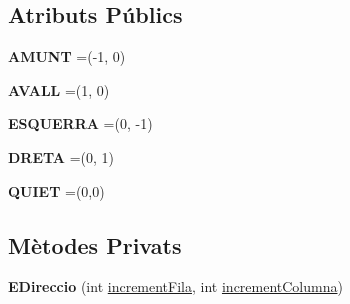 \subsection*{Atributs Públics}
\begin{DoxyCompactItemize}
\item 
\hypertarget{enumlogica_1_1enumeracions_1_1_e_direccio_a63eeb22e6f9d80a71a098b28e8852e1f}{{\bfseries A\+M\+U\+N\+T} =(-\/1, 0)}\label{enumlogica_1_1enumeracions_1_1_e_direccio_a63eeb22e6f9d80a71a098b28e8852e1f}

\item 
\hypertarget{enumlogica_1_1enumeracions_1_1_e_direccio_aa3a1d108fcda907ca1d07280769f1ec9}{{\bfseries A\+V\+A\+L\+L} =(1, 0)}\label{enumlogica_1_1enumeracions_1_1_e_direccio_aa3a1d108fcda907ca1d07280769f1ec9}

\item 
\hypertarget{enumlogica_1_1enumeracions_1_1_e_direccio_af02594ddfc4fb25ba88bd8b448701f30}{{\bfseries E\+S\+Q\+U\+E\+R\+R\+A} =(0, -\/1)}\label{enumlogica_1_1enumeracions_1_1_e_direccio_af02594ddfc4fb25ba88bd8b448701f30}

\item 
\hypertarget{enumlogica_1_1enumeracions_1_1_e_direccio_afcd65da7e385fd56a4d6bd779e18f241}{{\bfseries D\+R\+E\+T\+A} =(0, 1)}\label{enumlogica_1_1enumeracions_1_1_e_direccio_afcd65da7e385fd56a4d6bd779e18f241}

\item 
\hypertarget{enumlogica_1_1enumeracions_1_1_e_direccio_a252e9ca4de38eba90bca90b4ddc5cb3d}{{\bfseries Q\+U\+I\+E\+T} =(0,0)}\label{enumlogica_1_1enumeracions_1_1_e_direccio_a252e9ca4de38eba90bca90b4ddc5cb3d}

\end{DoxyCompactItemize}
\subsection*{Mètodes Privats}
\begin{DoxyCompactItemize}
\item 
\hypertarget{enumlogica_1_1enumeracions_1_1_e_direccio_a65f4af383abd221f6c2fb8b8277c8b86}{{\bfseries E\+Direccio} (int \hyperlink{enumlogica_1_1enumeracions_1_1_e_direccio_a7f54d2a6315924892ed78da3635a6358}{increment\+Fila}, int \hyperlink{enumlogica_1_1enumeracions_1_1_e_direccio_a55188904e0a2d50611f032d0fed63fac}{increment\+Columna})}\label{enumlogica_1_1enumeracions_1_1_e_direccio_a65f4af383abd221f6c2fb8b8277c8b86}

\end{DoxyCompactItemize}
